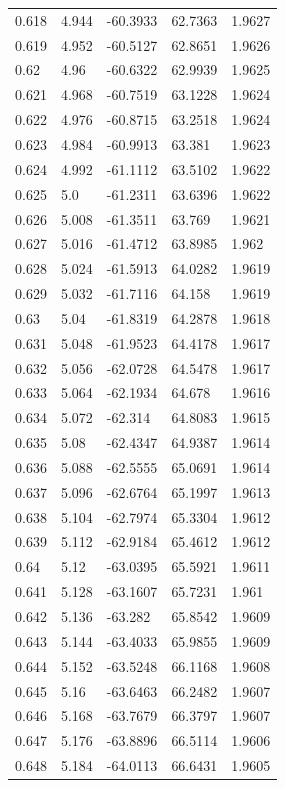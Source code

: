 \begin{tabular}{lllll}
0.618 & 4.944 & -60.3933 & 62.7363 & 1.9627 \\
0.619 & 4.952 & -60.5127 & 62.8651 & 1.9626 \\
0.62 & 4.96 & -60.6322 & 62.9939 & 1.9625 \\
0.621 & 4.968 & -60.7519 & 63.1228 & 1.9624 \\
0.622 & 4.976 & -60.8715 & 63.2518 & 1.9624 \\
0.623 & 4.984 & -60.9913 & 63.381 & 1.9623 \\
0.624 & 4.992 & -61.1112 & 63.5102 & 1.9622 \\
0.625 & 5.0 & -61.2311 & 63.6396 & 1.9622 \\
0.626 & 5.008 & -61.3511 & 63.769 & 1.9621 \\
0.627 & 5.016 & -61.4712 & 63.8985 & 1.962 \\
0.628 & 5.024 & -61.5913 & 64.0282 & 1.9619 \\
0.629 & 5.032 & -61.7116 & 64.158 & 1.9619 \\
0.63 & 5.04 & -61.8319 & 64.2878 & 1.9618 \\
0.631 & 5.048 & -61.9523 & 64.4178 & 1.9617 \\
0.632 & 5.056 & -62.0728 & 64.5478 & 1.9617 \\
0.633 & 5.064 & -62.1934 & 64.678 & 1.9616 \\
0.634 & 5.072 & -62.314 & 64.8083 & 1.9615 \\
0.635 & 5.08 & -62.4347 & 64.9387 & 1.9614 \\
0.636 & 5.088 & -62.5555 & 65.0691 & 1.9614 \\
0.637 & 5.096 & -62.6764 & 65.1997 & 1.9613 \\
0.638 & 5.104 & -62.7974 & 65.3304 & 1.9612 \\
0.639 & 5.112 & -62.9184 & 65.4612 & 1.9612 \\
0.64 & 5.12 & -63.0395 & 65.5921 & 1.9611 \\
0.641 & 5.128 & -63.1607 & 65.7231 & 1.961 \\
0.642 & 5.136 & -63.282 & 65.8542 & 1.9609 \\
0.643 & 5.144 & -63.4033 & 65.9855 & 1.9609 \\
0.644 & 5.152 & -63.5248 & 66.1168 & 1.9608 \\
0.645 & 5.16 & -63.6463 & 66.2482 & 1.9607 \\
0.646 & 5.168 & -63.7679 & 66.3797 & 1.9607 \\
0.647 & 5.176 & -63.8896 & 66.5114 & 1.9606 \\
0.648 & 5.184 & -64.0113 & 66.6431 & 1.9605 \\

\end{tabular}
